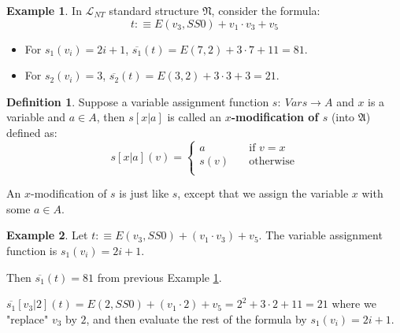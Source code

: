 \documentclass[11pt,letterpaper]{book}
\theoremstyle{definition}
\newtheorem{definition}{Definition}[section]
\newtheorem{example}{Example}[section]
\begin{document}
\begin{example}\label{example:formula_assignment_1}
In $\mathcal{L}_{NT}$ standard structure $\mathfrak{N}$, consider the
formula:
$$ t :\equiv E(v_3, SS0) + v_1 \cdot v_3 + v_5 $$

\begin{itemize}
\item{For $s_1(v_i) = 2i + 1$, $\overline{s_1} (t) = E(7, 2) + 3 \cdot 7
+ 11 = 81$.}
\item{For $s_2(v_i) = 3$, $\overline{s_2} (t) = E(3, 2) + 3 \cdot 3 + 3
= 21$.}
\end{itemize}

\end{example}


\begin{definition}\label{def:vaf_x_modification}
Suppose a variable assignment function $s: \ Vars \rightarrow A$ and $x$
is a variable and $a \in A$, then $s[x|a]$ is called an
\textbf{$x$-modification of $s$} (into $\mathfrak{A}$) defined as:
\begin{equation}
s[x|a](v) = \begin{cases}
a & \quad \text{if } v = x \\
s(v) & \quad \text{otherwise} \\
\end{cases}\nonumber
\end{equation}

\end{definition}

An $x$-modification of $s$ is just like $s$, except that we assign the
variable $x$ with some $a \in A$.

\begin{example}
Let $t : \equiv E(v_3, SS0) + (v_1 \cdot v_3) + v_5 $. The variable
assignment function is $s_1 (v_i) = 2 i + 1$.

Then $\overline{s_1}(t) = 81$ from previous Example
\ref{example:formula_assignment_1}.

$\overline{s_1} [v_3 | 2] (t) = E(2, SS0) + (v_1 \cdot 2) + v_5 = 2^2 +
3 \cdot 2 + 11 = 21 $ where we "replace" $v_3$ by $2$, and then evaluate
the rest of the formula by $s_1(v_i)= 2i + 1$.
\end{example}
\end{document}
